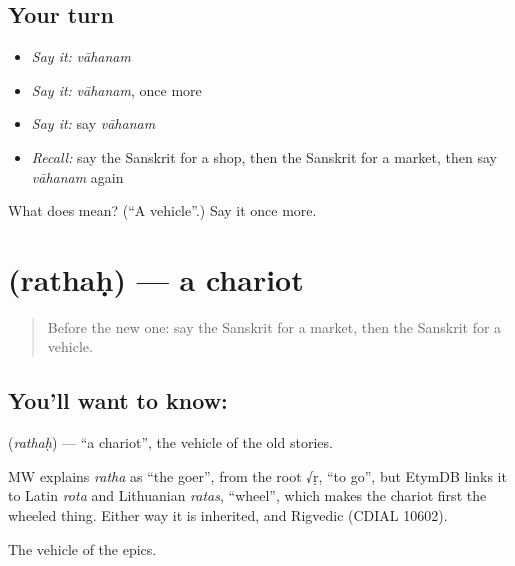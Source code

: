 \subsection*{Your turn}
\begin{itemize}
\raggedright
  \item \emph{Say it:} \emph{vāhanam}
  \item \emph{Say it:} \emph{vāhanam}, once more
  \item \emph{Say it:} say \emph{vāhanam}
  \item \emph{Recall:} say the Sanskrit for a shop, then the Sanskrit for a market, then say \emph{vāhanam} again
\end{itemize}

\begin{tcolorbox}[breakable,colback=teal!4,colframe=teal!35!black,title={Before you move on}]
What does  mean? (\textquotedblleft{}A vehicle\textquotedblright{}.) Say it once more.
\end{tcolorbox}
\section[\texorpdfstring{\sk{रथः} (rathaḥ)}{रथः (rathaḥ)}]{ (rathaḥ) — a chariot}

\label{lesson:SA-C75-chariot}



\begin{quote}
Before the new one: say the Sanskrit for a market, then the Sanskrit for a vehicle.
\end{quote}

\subsection*{You'll want to know: }
\textbf{} (\emph{rathaḥ}) — \textquotedblleft{}a chariot\textquotedblright{}, the vehicle of the old stories.

\begin{cousinweb}
MW explains \emph{ratha} as \textquotedblleft{}the goer\textquotedblright{}, from the root √ṛ, \textquotedblleft{}to go\textquotedblright{}, but EtymDB links it to Latin \emph{rota} and Lithuanian \emph{ratas}, \textquotedblleft{}wheel\textquotedblright{}, which makes the chariot first the wheeled thing. Either way it is inherited, and Rigvedic (CDIAL 10602).
\end{cousinweb}

\begin{grammarlens}[title={What you've built}]
The vehicle of the epics.
\end{grammarlens}

